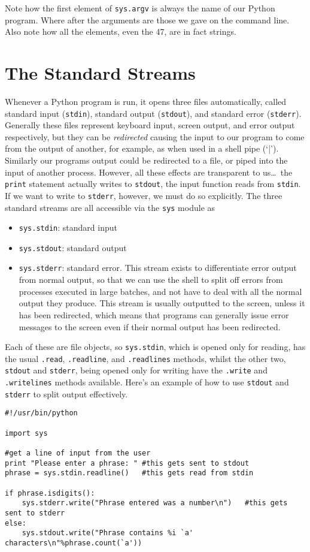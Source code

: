 Note how the first element of 
\texttt{sys.argv} is always the   name of our Python program. Where after the arguments are those we gave   on the command line. Also note how all the elements, even the 47, are   in fact strings.

\section{The Standard Streams}

Whenever a Python program is run, it opens three files   automatically, called standard input (\texttt{stdin}), standard output (\texttt{stdout}),   and standard error (\texttt{stderr}). Generally these files represent keyboard   input, screen output, and error output respectively, but they can be   \textit{redirected} causing the input to our program to come   from the output of another, for example, as when used in a shell pipe   (`|'). Similarly our programs output could be redirected to a file, or   piped into the input of another process. However, all these effects are   transparent to us\ldots\ the \texttt{print} statement actually writes to \texttt{stdout},   the input function reads from \texttt{stdin}. If we want to write to \texttt{stderr},   however, we must do so explicitly. The three standard streams are all   accessible via the \texttt{sys} module as
\begin{itemize}
	\item 
\texttt{sys.stdin}: standard input
	\item 
\texttt{sys.stdout}: standard output
	\item 
\texttt{sys.stderr}: standard error. This stream exists to    differentiate error output from normal output, so that we can use    the shell to split off errors from processes executed in large    batches, and not have to deal with all the normal output they    produce. This stream is usually outputted to the screen, unless it    has been redirected, which means that programs can generally issue    error messages to the screen even if their normal output has been    redirected.
\end{itemize}

Each of these are file objects, so \texttt{sys.stdin}, which is opened only   for reading, has the usual 
\texttt{.read}, 
\texttt{.readline},   and 
\texttt{.readlines} methods, whilst the other two, \texttt{stdout} and   \texttt{stderr}, being opened only for writing have the 
\texttt{.write} and   
\texttt{.writelines} methods available. Here's an example of how to   use \texttt{stdout} and \texttt{stderr} to split output effectively.
\begin{lstlisting}
#!/usr/bin/python

import sys

#get a line of input from the user
print "Please enter a phrase: "	#this gets sent to stdout
phrase = sys.stdin.readline()	#this gets read from stdin

if phrase.isdigits():
    sys.stderr.write("Phrase entered was a number\n")	#this gets sent to stderr
else:
    sys.stdout.write("Phrase contains %i `a' characters\n"%phrase.count(`a'))
\end{lstlisting}

